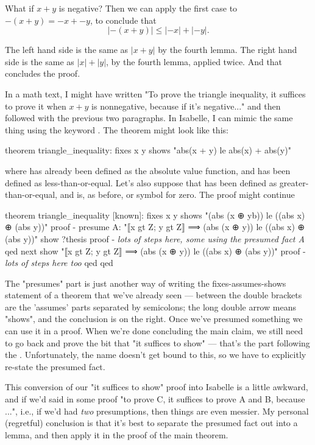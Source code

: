 What if $x + y$ is negative? Then we can apply the first case to $-(x+y) = -x + -y$, to conclude that 
$$
|-(x+y)| \le |-x| + |-y|.$$

The left hand side is the same as $|x+y|$ by the fourth lemma. The right hand side is the same as $|x| + |y|$, by the fourth lemma, applied twice. And that concludes the proof. 

In a math text, I might have written "To prove the triangle inequality, it suffices to prove it when $x + y$ is nonnegative, because if it's negative..." and then followed with the previous two paragraphs. In Isabelle, I can mimic the same thing using the keyword . The theorem might look like this:
\begin{IS}
theorem triangle_inequality:
  fixes x y
  shows "abs(x + y) le abs(x) + abs(y)"
\end{IS}
where  has already been defined as the absolute value function, and  has been defined as less-than-or-equal. Let's also suppose that  has been defined as greater-than-or-equal, and  is, as before, or symbol for zero. The proof might continue
\begin{IS}
theorem triangle_inequality [known]:
  fixes x y
  shows "(abs (x ⊕ yb)) le  ((abs x)  ⊕ (abs y))"
proof -
  presume A: "⟦x gt Z; y gt Z⟧ ⟹ (abs (x ⊕ y)) le  ((abs x)  ⊕ (abs y))"
  show ?thesis  
  proof -
    \textit{lots of steps here, some using the presumed fact A}
  qed 
next
  show "⟦x gt Z; y gt Z⟧ ⟹ (abs (x ⊕ y)) le  ((abs x)  ⊕ (abs y))"
  proof -
     \textit{lots of steps here too}
  qed
qed
\end{IS}

The "presumes" part is just another way of writing the fixes-assumes-shows statement of a theorem that we've already seen --- between the double brackets are the 'assumes' parts separated by semicolons; the long double arrow means "shows", and the conclusion is on the right. Once we've presumed something
we can use it in a proof. When we're done concluding the main claim, we still need to go back and prove the bit that "it suffices to show" --- that's the part following the . Unfortunately, the name  doesn't get bound to this, so we have to explicitly re-state the presumed fact. 

This conversion of our "it suffices to show" proof into Isabelle is a little awkward, and if we'd said in some proof "to prove C, it suffices to prove A and B, because ...", i.e., if we'd had \textit{two} presumptions, then things are even messier. My personal (regretful) conclusion is that it's best to separate the presumed fact out into a lemma, and then apply it in the proof of the main theorem. 

